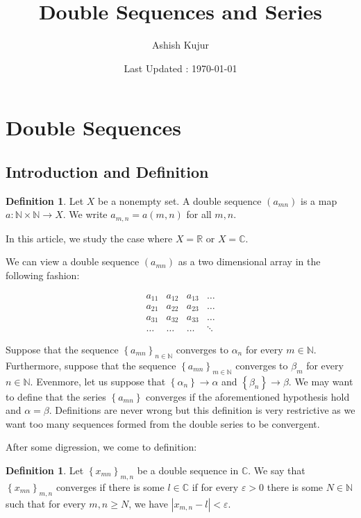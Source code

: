 \documentclass[12pt]{article}
\title{Double Sequences and Series}
\author{Ashish Kujur}
\date{Last Updated : \today}
\theoremstyle{definition}
\newtheorem{definition}[theorem]{Definition}
\theoremstyle{remark}
\theoremstyle{plain}
\newcommand{\R}{\mathbb R}
\newcommand{\N}{\mathbb N}
\newcommand{\C}{\mathbb C}
\begin{document}
\maketitle

\section{Double Sequences}
\subsection{Introduction and Definition}
\begin{definition}
    Let $X$ be a nonempty set. A double sequence $\left( a_{mn} \right)$ is a map $a: \N \times \N \to X$. We write $ a_{m, n} = a\left( m, n \right)$ for all $m,n$. 
    \label{def:doubleSeq}
\end{definition}

In this article, we study the case where $X=\R$ or $X=\C$.

We can view a double sequence $\left( a_{mn} \right)$ as a two dimensional array in the following fashion:

$$\begin{matrix}
    a_{11} & a_{12} & a_{13} & \ldots \\

    a_{21} & a_{22} & a_{23} & \ldots \\
    
    a_{31} & a_{32} & a_{33} & \ldots \\
    
    \hdots & \hdots & \hdots & \ddots
\end{matrix}$$

Suppose that the sequence $\left\{ a_{mn} \right\}_{n\in \N}$ converges to $\alpha _n$ for every $m\in\N$. Furthermore, suppose that the sequence $\left\{ a_{mn} \right\}_{m\in \N}$ converges to $\beta _m$ for every $n\in\N$. Evenmore, let us suppose that $\left\{ \alpha _n \right\} \to \alpha$ and $\left\{ \beta _n \right\} \to \beta$. We may want to define that the series $\left\{ a_{mn} \right\}$ converges if the aforementioned hypothesis hold and $\alpha = \beta$. Definitions are never wrong but this definition is very restrictive as we want too many sequences formed from the double series to be convergent.


After some digression, we come to definition:

\begin{definition}
    Let $\left\{ x_{mn} \right\}_{m,n}$ be a double sequence in $\C$. We say that $\left\{ x_{mn} \right\}_{m,n}$ converges if there is some $l \in \C$ if for every $\varepsilon > 0$ there is some $N \in \N$ such that for every $m,n \ge N$, we have $|x_{m,n} - l| < \varepsilon$.
    \label{def:convDoubleSeq}
\end{definition}
\end{document}
